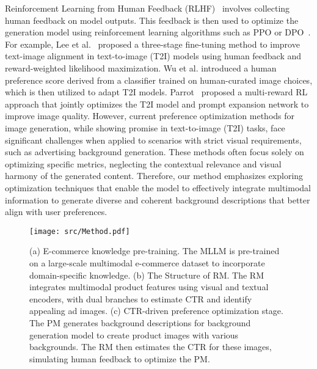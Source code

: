 Reinforcement Learning from Human Feedback (RLHF)~\cite{ziegler2019fine,bai2022training,ouyang2022training} involves collecting human feedback on model outputs. This feedback is then used to optimize the generation model using reinforcement learning algorithms such as PPO\cite{schulman2017proximal} or DPO~\cite{rafailov2024direct}.
%
For example, Lee et al.~\cite{lee2023aligning} proposed a three-stage fine-tuning method to improve text-image alignment in text-to-image (T2I) models using human feedback and reward-weighted likelihood maximization.
Wu et al.\cite{wu2023better} introduced a human preference score derived from a classifier trained on human-curated image choices, which is then utilized to adapt T2I models. Parrot~\cite{lee2024parrot} proposed a multi-reward RL approach that jointly optimizes the T2I model and prompt expansion network to improve image quality.
%
However, current preference optimization methods for image generation, while showing promise in text-to-image (T2I) tasks, face significant challenges when applied to scenarios with strict visual requirements, such as advertising background generation. These methods often focus solely on optimizing specific metrics, neglecting the contextual relevance and visual harmony of the generated content. 
%
Therefore, our method emphasizes exploring optimization techniques that enable the model to effectively integrate multimodal information to generate diverse and coherent background descriptions that better align with user preferences.

\begin{figure*}[t!]
    \centering
    \texttt{[image: src/Method.pdf]}
    \vspace{-1em}
    \caption{(a) E-commerce knowledge pre-training. The MLLM is pre-trained on a large-scale multimodal e-commerce dataset to incorporate domain-specific knowledge. (b) The Structure of RM. The RM integrates multimodal product features using visual and textual encoders, with dual branches to estimate CTR and identify appealing ad images. (c)  CTR-driven preference optimization stage. The PM generates background descriptions for background generation model to create product images with various backgrounds. The RM then estimates the CTR for these images, simulating human feedback to optimize the PM.}
    \label{fig:1}
\end{figure*}